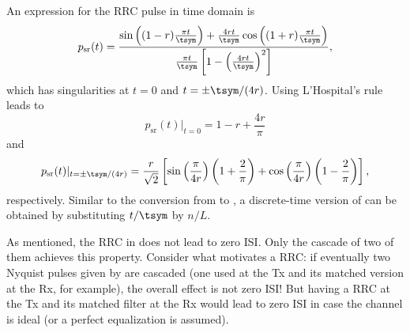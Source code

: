 An expression for the RRC pulse in time domain is
\begin{equation}
p_{\textrm{sr}}(t) = \frac{ \sin \left( (1-r) \frac{\pi t}{\tsym} \right) +
\frac{4 r t}{\tsym} \cos \left( (1+r) \frac{\pi t}{\tsym} \right) }
{ \frac{\pi t}{\tsym}  \left[ 1 - \left( \frac{4 r t}{\tsym} \right)^2 \right] },
\label{eq:sqrtRC}
\end{equation}
which has singularities at $t=0$ and $t=\pm \tsym / (4r)$. Using L'Hospital's rule leads to
\[
p_{\textrm{sr}}(t)|_{t=0} = 1 - r + \frac{4r}{\pi}
\]
and
\[
p_{\textrm{sr}}(t)|_{t=\pm \tsym / (4r)} = \frac{r}{\sqrt{2}} \left[ \sin \left( \frac{\pi}{4r }\right)  \left(1 + \frac{2}{\pi}\right) +
\cos \left( \frac{\pi}{4r }\right)  \left(1 - \frac{2}{\pi}\right)  \right],
\]
respectively.
Similar to the conversion from  to , a discrete-time version of  can be obtained by substituting $t / \tsym$ by $n/L$.

As mentioned, the RRC in  does not lead to zero ISI. Only the cascade of two of them achieves this property. Consider what motivates a RRC: if eventually two Nyquist pulses given by  are cascaded (one used at the Tx and its matched version at the Rx, for example), the overall effect is not zero ISI! But having a RRC at the Tx and its matched filter at the Rx would lead to zero ISI in case the channel is ideal (or a perfect equalization is assumed).





